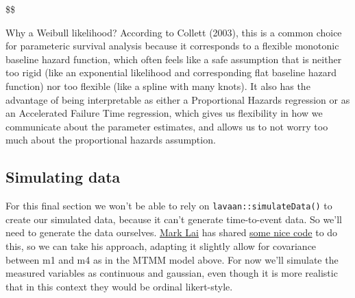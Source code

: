 \documentclass[
  letterpaper,
  DIV=11,
  numbers=noendperiod]{scrreprt}
\begin{document}
\$\$

Why a Weibull likelihood? According to Collett (2003), this is a common
choice for parameteric survival analysis because it corresponds to a
flexible monotonic baseline hazard function, which often feels like a
safe assumption that is neither too rigid (like an exponential
likelihood and corresponding flat baseline hazard function) nor too
flexible (like a spline with many knots). It also has the advantage of
being interpretable as either a Proportional Hazards regression or as an
Accelerated Failure Time regression, which gives us flexibility in how
we communicate about the parameter estimates, and allows us to not worry
too much about the proportional hazards assumption.

\hypertarget{simulating-data}{%
\subsection{Simulating data}\label{simulating-data}}

For this final section we won't be able to rely on
\texttt{lavaan::simulateData()} to create our simulated data, because it
can't generate time-to-event data. So we'll need to generate the data
ourselves.
\href{https://scholar.google.com/citations?user=s2LhwXAAAAAJ\&hl=en}{Mark
Lai} has shared
\href{https://bookdown.org/marklhc/notes/simulation-example-on-structural-equation-modeling-sem.html\#full-example-of-a-small-scale-simulation}{some
nice code} to do this, so we can take his approach, adapting it slightly
allow for covariance between m1 and m4 as in the MTMM model above. For
now we'll simulate the measured variables as continuous and gaussian,
even though it is more realistic that in this context they would be
ordinal likert-style.
\end{document}

